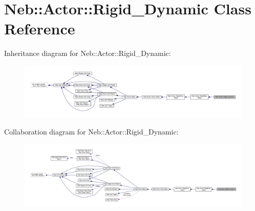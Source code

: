 \hypertarget{classNeb_1_1Actor_1_1Rigid__Dynamic}{\section{Neb\-:\-:Actor\-:\-:Rigid\-\_\-\-Dynamic Class Reference}
\label{classNeb_1_1Actor_1_1Rigid__Dynamic}
}


Inheritance diagram for Neb\-:\-:Actor\-:\-:Rigid\-\_\-\-Dynamic\-:
\nopagebreak
\begin{figure}[H]
\begin{center}
\leavevmode
\includegraphics[width=350pt]{classNeb_1_1Actor_1_1Rigid__Dynamic__inherit__graph}
\end{center}
\end{figure}


Collaboration diagram for Neb\-:\-:Actor\-:\-:Rigid\-\_\-\-Dynamic\-:
\nopagebreak
\begin{figure}[H]
\begin{center}
\leavevmode
\includegraphics[width=350pt]{classNeb_1_1Actor_1_1Rigid__Dynamic__coll__graph}
\end{center}
\end{figure}
